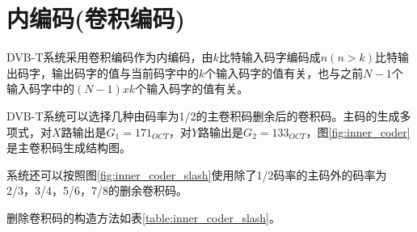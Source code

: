 	\section{内编码(卷积编码)}
		\par DVB-T系统采用卷积编码作为内编码，由$k$比特输入码字编码成$n(n>k)$比特输出码字，输出码字的值与当前码字中的$k$个输入码字的值有关，也与之前$N-1$个输入码字中的$(N-1)xk$个输入码字的值有关。
		\par DVB-T系统可以选择几种由码率为1/2的主卷积码删余后的卷积码。主码的生成多项式，对$X$路输出是$G_1=171_{OCT}$，对$Y$路输出是$G_2=133_{OCT}$，图\ref{fig:inner_coder}是主卷积码生成结构图。
		
		\par 系统还可以按照图\ref{fig:inner_coder_slash}使用除了1/2码率的主码外的码率为2/3，3/4，5/6，7/8的删余卷积码。
		
		\par 删除卷积码的构造方法如表\ref{table:inner_coder_slash}。
		
